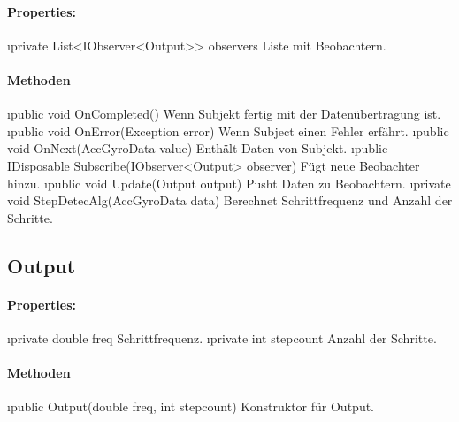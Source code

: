 \documentclass[../entwurf.tex]{subfiles}
\begin{document}
        \paragraph{Properties:}
        \begin{itemize}
            \i{private List<IObserver<Output>> observers} Liste mit Beobachtern.
        \end{itemize}
    
        \paragraph{Methoden}
        \begin{itemize}
            \i{public void OnCompleted()} Wenn Subjekt fertig mit der Datenübertragung ist.
            \i{public void OnError(Exception error)} Wenn Subject einen Fehler erfährt.
            \i{public void OnNext(AccGyroData value)} Enthält Daten von Subjekt.
            \i{public IDisposable Subscribe(IObserver<Output> observer)} Fügt neue Beobachter hinzu.
            \i{public void Update(Output output)} Pusht Daten zu Beobachtern.
            \i{private void StepDetecAlg(AccGyroData data)} Berechnet Schrittfrequenz und Anzahl der Schritte.
        \end{itemize}
    
    \subsection{Output}
        \paragraph{Properties:}
        \begin{itemize}
            \i{private double freq} Schrittfrequenz. %
            \i{private int stepcount} Anzahl der Schritte.
        \end{itemize}
        \paragraph{Methoden}
        \begin{itemize}
            \i{public Output(double freq, int stepcount)} Konstruktor für Output.
        \end{itemize}


                        
\end{document}
